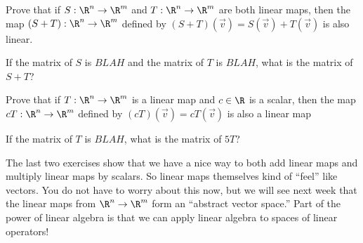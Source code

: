 \documentclass{ximera}
\begin{document}
\begin{question}
  Prove that if $S:\R^n \to\R^m$ and $T:\R^n \to \R^m$ are both linear maps, 
  then the map $(S+T):\R^n \to\R^m$ defined by $(S+T)(\vec{v}) = S(\vec{v})+T(\vec{v})$ is also linear.
\end{question}

\begin{question}
  If the matrix of $S$ is $BLAH$ and the matrix of $T$ is $BLAH$, what is the matrix of $S+T$?
\end{question}

\begin{question}
  Prove that if $T:\R^n \to \R^m$ is a linear map and $c \in \R$ is a scalar, then the map $cT:\R^n \to \R^m$  defined by $(cT)(\vec{v}) = cT(\vec{v})$ is also 
  a linear map
\end{question}

\begin{question}
  If the matrix of $T$ is $BLAH$, what is the matrix of $5T$?
\end{question}

\begin{observation}
The last two exercises show that we have a nice way to both add linear
maps and multiply linear maps by scalars.  So linear maps themselves
kind of ``feel'' like vectors.  You do not have to worry about this
now, but we will see next week that the linear maps from $\R^n \to
\R^m$ form an ``abstract vector space.''  Part of the power of linear
algebra is that we can apply linear algebra to spaces of linear
operators!
\end{observation}
	
\end{document}
